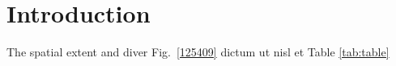 \section{Introduction}
\label{introduction}

The spatial extent and diver Fig.~\ref{125409} dictum ut nisl et Table \ref{tab:table}
